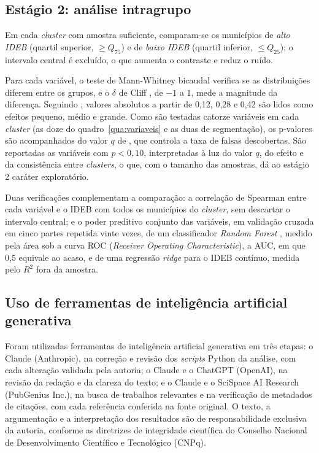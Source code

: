 \subsection{Estágio 2: análise intragrupo}

Em cada \textit{cluster} com amostra suficiente, comparam-se os municípios de \textit{alto IDEB} (quartil superior, $\geq Q_{75}$) e de \textit{baixo IDEB} (quartil inferior, $\leq Q_{25}$); o intervalo central é excluído, o que aumenta o contraste e reduz o ruído.

Para cada variável, o teste de Mann-Whitney \parencite{mannwhitney1947} bicaudal verifica se as distribuições diferem entre os grupos, e o $\delta$ de Cliff \parencite{cliff1993}, de $-1$ a $1$, mede a magnitude da diferença. Seguindo \textcite{vargha2000}, valores absolutos a partir de 0,12, 0,28 e 0,42 são lidos como efeitos pequeno, médio e grande. Como são testadas catorze variáveis em cada \textit{cluster} (as doze do quadro~\ref{qua:variaveis} e as duas de segmentação), os p-valores são acompanhados do valor $q$ de \textcite{benjamini1995}, que controla a taxa de falsas descobertas. São reportadas as variáveis com $p < 0{,}10$, interpretadas à luz do valor $q$, do efeito e da consistência entre \textit{clusters}, o que, com o tamanho das amostras, dá ao estágio 2 caráter exploratório.

Duas verificações complementam a comparação: a correlação de Spearman entre cada variável e o IDEB com todos os municípios do \textit{cluster}, sem descartar o intervalo central; e o poder preditivo conjunto das variáveis, em validação cruzada em cinco partes repetida vinte vezes, de um classificador \textit{Random Forest} \parencite{breiman2001}, medido pela área sob a curva ROC (\textit{Receiver Operating Characteristic}), a AUC, em que 0,5 equivale ao acaso, e de uma regressão \textit{ridge} \parencite{hoerl1970} para o IDEB contínuo, medida pelo $R^2$ fora da amostra.

\subsection{Uso de ferramentas de inteligência artificial generativa}
\label{sec:uso_ia}

Foram utilizadas ferramentas de inteligência artificial generativa em três etapas: o Claude (Anthropic), na correção e revisão dos \textit{scripts} Python da análise, com cada alteração validada pela autoria; o Claude e o ChatGPT (OpenAI), na revisão da redação e da clareza do texto; e o Claude e o SciSpace AI Research (PubGenius Inc.), na busca de trabalhos relevantes e na verificação de metadados de citações, com cada referência conferida na fonte original. O texto, a argumentação e a interpretação dos resultados são de responsabilidade exclusiva da autoria, conforme as diretrizes de integridade científica do Conselho Nacional de Desenvolvimento Científico e Tecnológico (CNPq).

